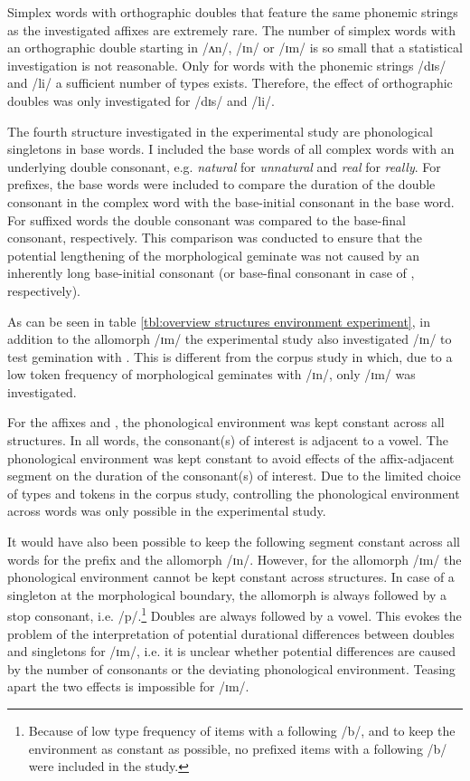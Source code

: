 \clearpage

Simplex words with orthographic doubles that feature the same phonemic strings as the investigated affixes are extremely rare. The number of simplex words with an orthographic double starting in /ʌn/, /ɪn/ or /ɪm/ is so small that a statistical investigation is not reasonable. Only for words with the phonemic strings /dɪs/ and /li/ a sufficient number of types exists. Therefore, the effect of orthographic doubles was only investigated for /dɪs/ and /li/. 


The fourth structure investigated in the experimental study are phonological singletons in base words. I included the base words of all complex words with an underlying double consonant, e.g. \textit{natural} for \textit{unnatural} and \textit{real} for \textit{really}. For prefixes, the base words were included to compare the duration of the double consonant in the complex word with the base-initial consonant in the base word. For suffixed words the double consonant was compared to the base-final consonant, respectively. This comparison was conducted to ensure that the potential lengthening of the morphological geminate was not caused by an inherently long base-initial consonant (or base-final consonant in case of , respectively).


As can be seen in table \ref{tbl:overview structures environment experiment}, in addition to  the allomorph /ɪm/  the experimental study also investigated /ɪn/ to test gemination with . This is different from the corpus study in which, due to a low token frequency of morphological geminates with /ɪn/, only /ɪm/ was investigated.  

For the affixes  and , the phonological environment was kept constant across all structures. In all words, the consonant(s) of interest is adjacent to a vowel. 
The phonological environment was kept constant to avoid effects of the affix-adjacent segment on the duration of the consonant(s) of interest. Due to the limited choice of types and tokens in the corpus study, controlling the phonological environment across words was only possible in the experimental study.%

It would have also been possible to keep the following segment constant across all words for the prefix  and the allomorph /ɪn/. However, for the allomorph /ɪm/ the phonological environment cannot be kept constant across structures. In case of a singleton at the morphological boundary, the allomorph is always followed  by a stop consonant, i.e. /p/.\footnote{Because of low type frequency of items with a following /b/, and to keep the environment as constant as possible, no prefixed items with a following /b/ were included in the study.} Doubles are always followed by a vowel. This evokes the problem of the interpretation of potential durational differences between doubles and singletons for /ɪm/, i.e. it is unclear whether potential differences are caused by the number of consonants or the deviating phonological environment. Teasing apart the two effects is impossible for /ɪm/.

